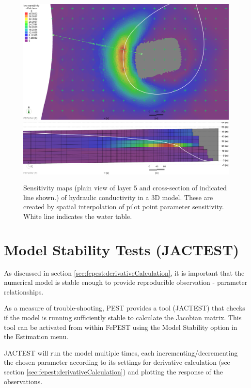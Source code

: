 \begin{figure}
	\center
	\includegraphics[width=\columnwidth]{figures/SensititivityExampleLayer5.png}
	\includegraphics[width=\columnwidth]{figures/SensititivityExampleXSect.png}
\caption{Sensitivity maps (plain view of layer 5 and cross-section of indicated line shown.) of hydraulic conductivity in a 3D model. These are created by spatial interpolation of pilot point parameter sensitivity. White line indicates the water table.}
\label{fig:fepest:SensitivityMapMine}
\end{figure}

\section{Model Stability Tests (JACTEST)}
\label{sec:fepest:Jactest}

As discussed in section \ref{sec:fepest:derivativeCalculation}, it is important that the numerical model is stable enough to provide reproducible observation - parameter relationships. 

As a measure of trouble-shooting, PEST provides a tool (JACTEST) that checks if the model is running sufficiently stable to calculate the Jacobian matrix. This tool can be activated from within FePEST using the Model Stability option in the Estimation menu. 

JACTEST will run the model multiple times, each incrementing/decrementing the chosen parameter according to its settings for derivative calculation (see section \ref{sec:fepest:derivativeCalculation}) and plotting the response of the observations.

